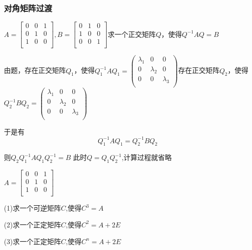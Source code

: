 \documentclass[lang=cn,10pt]{elegantbook}
\begin{document}
\subsubsection{对角矩阵过渡}
\begin{example}
$	A=\left[ \begin{matrix}
		0&		0&		1\\
		0&		1&		0\\
		1&		0&		0\\
	\end{matrix} \right] ,B=\left[ \begin{matrix}
		0&		1&		0\\
		1&		0&		0\\
		0&		0&		1\\
	\end{matrix} \right] $求一个正交矩阵$Q$，使得$Q^{-1}AQ=B$
\end{example}
\begin{solution}
	
	由题，存在正交矩阵$Q_{1}$，使得$Q_{1}^{-1}AQ_{1}=\left( \begin{matrix}
		\lambda _1&		0&		0\\
		0&		\lambda _2&		0\\
		0&		0&		\lambda _3\\
	\end{matrix} \right) $存在正交矩阵$Q_{2}$，使得$Q^{-1}_{2}BQ_{2}=\left( \begin{matrix}
	\lambda _1&		0&		0\\
	0&		\lambda _2&		0\\
	0&		0&		\lambda _3\\
	\end{matrix} \right) $
	
	于是有
	\begin{equation*}
		Q_{1}^{-1}AQ_{1}=Q^{-1}_{2}BQ_{2}
	\end{equation*}
	
	则$Q_{2}	Q_{1}^{-1}AQ_{1}Q^{-1}_{2}=B$
	此时$Q=Q_{1}Q^{-1}_{2}$,计算过程就省略
\end{solution}
\begin{example}
	$A=\left[ \begin{matrix}
		0&		0&		1\\
		0&		1&		0\\
		1&		0&		0\\
	\end{matrix} \right]$
	
	(1)求一个可逆矩阵$C$,使得$C^{3}=A$
	
	(2)求一个正定矩阵$C$,使得$C^{2}=A+2E$
	
	(3)求一个正定矩阵$C$,使得$C^{n}=A+2E$
\end{example}
\end{document}
